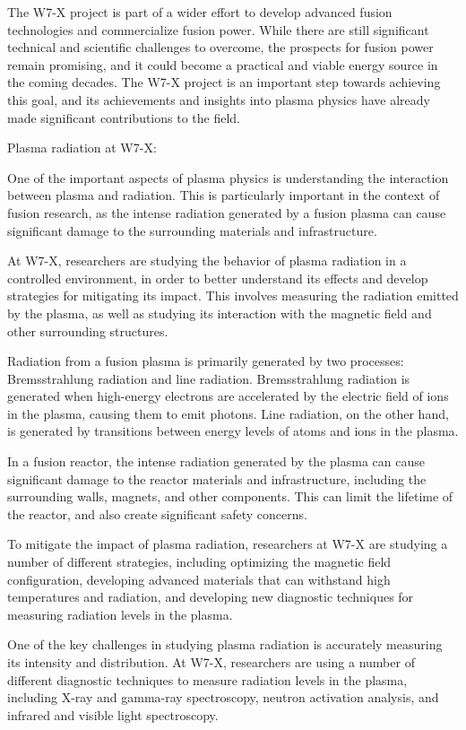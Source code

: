 \documentclass[12pt]{article}
\begin{document}
The W7-X project is part of a wider effort to develop advanced fusion technologies and commercialize fusion power. While there are still significant technical and scientific challenges to overcome, the prospects for fusion power remain promising, and it could become a practical and viable energy source in the coming decades. The W7-X project is an important step towards achieving this goal, and its achievements and insights into plasma physics have already made significant contributions to the field.

Plasma radiation at W7-X:

One of the important aspects of plasma physics is understanding the interaction between plasma and radiation. This is particularly important in the context of fusion research, as the intense radiation generated by a fusion plasma can cause significant damage to the surrounding materials and infrastructure.

At W7-X, researchers are studying the behavior of plasma radiation in a controlled environment, in order to better understand its effects and develop strategies for mitigating its impact. This involves measuring the radiation emitted by the plasma, as well as studying its interaction with the magnetic field and other surrounding structures.

Radiation from a fusion plasma is primarily generated by two processes: Bremsstrahlung radiation and line radiation. Bremsstrahlung radiation is generated when high-energy electrons are accelerated by the electric field of ions in the plasma, causing them to emit photons. Line radiation, on the other hand, is generated by transitions between energy levels of atoms and ions in the plasma.

In a fusion reactor, the intense radiation generated by the plasma can cause significant damage to the reactor materials and infrastructure, including the surrounding walls, magnets, and other components. This can limit the lifetime of the reactor, and also create significant safety concerns.

To mitigate the impact of plasma radiation, researchers at W7-X are studying a number of different strategies, including optimizing the magnetic field configuration, developing advanced materials that can withstand high temperatures and radiation, and developing new diagnostic techniques for measuring radiation levels in the plasma.

One of the key challenges in studying plasma radiation is accurately measuring its intensity and distribution. At W7-X, researchers are using a number of different diagnostic techniques to measure radiation levels in the plasma, including X-ray and gamma-ray spectroscopy, neutron activation analysis, and infrared and visible light spectroscopy.
\end{document}
